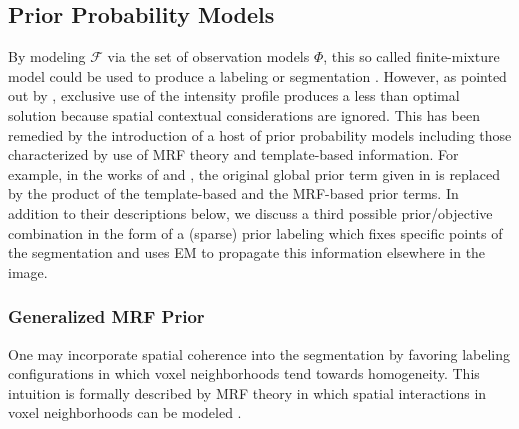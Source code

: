 \documentclass[11pt,english]{article}
\begin{document}
\subsection{Prior Probability Models}
By modeling $\mathcal{F}$ via the set of observation models $\Phi$,
this so called finite-mixture model could be used to produce a
labeling or segmentation \citep[e.g.][]{Wells1996}.  However, as
pointed out by \cite{Zhang2001}, exclusive use of the intensity profile produces a less than optimal
solution because spatial contextual considerations are ignored.  This
has been remedied by the introduction of a host of prior probability
models including those characterized by use of MRF theory and
template-based information.  For example, in the works of
\cite{Leemput1999a} and \cite{Weisenfeld2009}, the original global
prior term given in \cite{Wells1996} is replaced by the product of the
template-based and the MRF-based prior terms.  In addition to their
descriptions below, we discuss a third possible
prior/objective combination in the form of a (sparse) prior labeling which fixes specific points
of the segmentation and uses EM to propagate this information
elsewhere in the image.  

\subsubsection{Generalized MRF Prior}
One may incorporate spatial coherence into the segmentation by
favoring labeling configurations in which voxel neighborhoods tend
towards homogeneity. This intuition is formally described by MRF
theory in which spatial interactions in voxel neighborhoods can be
modeled \citep{Li2001}.
\end{document}
